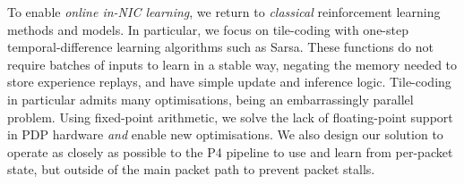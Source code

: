 \documentclass[
sigconf,natbib=false
]{acmart}
\begin{document}




To enable \emph{online in-NIC learning}, we return to \emph{classical} reinforcement learning methods and models.
In particular, we focus on tile-coding with one-step temporal-difference learning algorithms such as Sarsa.
These functions do not require batches of inputs to learn in a stable way, negating the memory needed to store experience replays, and have simple update and inference logic.
Tile-coding in particular admits many optimisations, being an embarrassingly parallel problem.
Using fixed-point arithmetic, we solve the lack of floating-point support in PDP hardware \emph{and} enable new optimisations.
We also design our solution to operate as closely as possible to the P4 pipeline to use and learn from per-packet state, but outside of the main packet path to prevent packet stalls.

\end{document}
